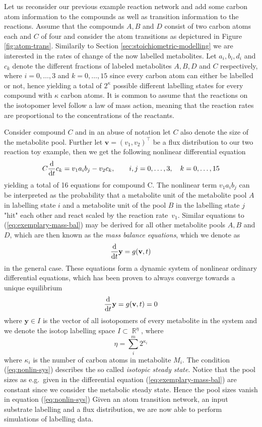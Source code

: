 \documentclass[10pt]{article}
\newcommand{\eg}{e.g.~}
\newcommand{\mb}[1]{\mathbf{#1}}
\DeclareMathOperator\Reals{\mathbb{R}}
\begin{document}
\bigskip \noindent 
Let us reconsider our previous example reaction network and add some carbon atom information to the compounds 
as well as transition information to the reactions. 
Assume that the compounds $A, B$ and $D$ consist of two carbon atoms each and $C$ of four and consider the 
atom transitions as depictured in Figure \ref{fig:atom-trans}.
Similarily to Section \ref{sec:stoichiometric-modelling} we are interested in the rates of change of the now labelled metabolites.
Let $a_i, b_i, d_i$ and $c_k$ denote the different fractions of labeled metabolites $A, B, D$ and $C$ respectively, 
where $i=0,\dots,3$ and $k=0,\dots,15$ since every carbon atom can either be labelled or not, hence yielding 
a total of $2^\kappa$ possible different labelling states for every compound with $\kappa$ carbon atoms.
It is common to assume that the reactions on the isotopomer level follow a law of mass action, 
meaning that the reaction rates are proportional to the concentrations of the reactants.

Consider compound $C$ and in an abuse of notation let $C$ also denote the size of the metabolite pool.
Further let $\mb{v}=(v_1, v_2)^\top$ be a flux distribution to our two reaction toy example, 
then we get the following nonlinear differential equation
\begin{align}
    C \dv{t} c_k = v_1 a_i b_j - v_2 c_k, \qquad i,j=0,\dots,3, \quad k = 0, \dots, 15 
    \label{eq:exemplary-mass-bal}
\end{align}
yielding a total of 16 equations for compound C.
The nonlinear term $v_1 a_i b_j$ can be interpreted as the probability that a metabolite unit of the metabolite
pool $A$ in labelling state $i$ and a metabolite unit of the pool $B$ in the labelling state $j$ "hit" each other
and react scaled by the reaction rate~$v_1$. 
Similar equations to (\ref{eq:exemplary-mass-bal}) may be derived for all other metabolite pools $A, B$ and $D$,
which are then known as the \emph{mass balance equations}, which we denote as
\begin{align}
    \dv{t}\mb{y} = g(\mb{v}, t) \label{eq:mass-bal}
\end{align}
in the general case.
These equations form a dynamic system of nonlinear ordinary differential equations, 
which has been proven to always converge towards a unique equilibrium \cite{wiechert01}
\begin{align}
    \dv{t} \mb{y} = g(\mb{v}, t) = 0 \label{eq:nonlin-sys}
\end{align}
where $\mb{y} \in I$ is the vector of all isotopomers of every metabolite in the system 
and we denote the isotop labelling space $I \subset \Reals^\eta$, where 
\[
    \eta = \sum_i^m 2^{\kappa_i}
\]
where $\kappa_i$ is the number of carbon atoms in metabolite $M_i$.
The condition (\ref{eq:nonlin-sys}) describes the so called \emph{isotopic steady state}.
Notice that the pool sizes as \eg given in the differential equation (\ref{eq:exemplary-mass-bal})
are constant since we consider the metabolic steady state.
Hence the pool sizes vanish in equation (\ref{eq:nonlin-sys})
Given an atom transition network, an input substrate labelling and a flux distribution, 
we are now able to perform simulations of labelling data.
\end{document}

